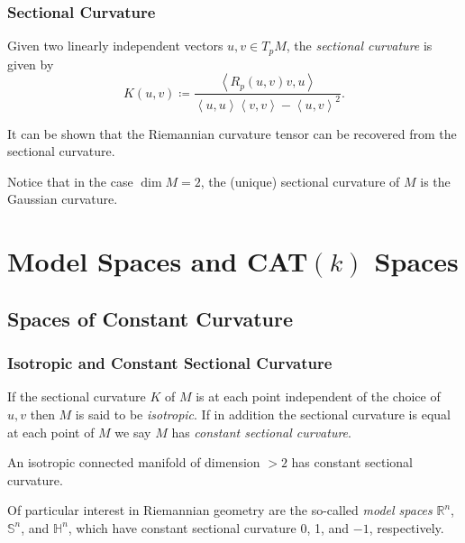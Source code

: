 \documentclass{beamer}
\newcommand{\Sp}{\mathbb{S}}
\newcommand{\Hy}{\mathbb{H}}
\newcommand{\R}{\mathbb{R}}
\newcommand{\inprod}[2]{\left\langle #1, #2 \right\rangle}
\theoremstyle{definition}
\begin{document}
\begin{frame}
    \frametitle{Sectional Curvature}

    \begin{definition}
        Given two linearly independent vectors $u, v \in T_pM$, the \emph{sectional curvature}
        is given by
        \[
            K(u,v) \coloneqq \frac{\inprod{R_p(u,v)v}{u}}{\inprod{u}{u}\inprod{v}{v} - \inprod{u}{v}^2}.
        \]
    \end{definition}

    It can be shown that the Riemannian curvature tensor can be recovered from the
    sectional curvature.

    Notice that in the case $\dim M = 2$, the (unique) sectional curvature of $M$ is the
    Gaussian curvature.

\end{frame}

\section{Model Spaces and CAT$(k)$ Spaces}

\subsection{Spaces of Constant Curvature}

\begin{frame}
    \frametitle{Isotropic and Constant Sectional Curvature}

    \begin{definition}
        If the sectional curvature $K$ of $M$ is at each point independent of the
        choice of $u,v$ then $M$ is said to be \emph{isotropic}. If in addition
        the sectional curvature is equal at each point of $M$ we say $M$ has
        \emph{constant sectional curvature}.
    \end{definition}

    \begin{lemma}
        An isotropic connected manifold of dimension $> 2$ has constant sectional curvature.
    \end{lemma}

    Of particular interest in Riemannian geometry are the so-called
    \emph{model spaces} $\R^n$, $\Sp^n$, and $\Hy^n$, which have constant
    sectional curvature 0, 1, and $-1$, respectively.

\end{frame}
\end{document}
